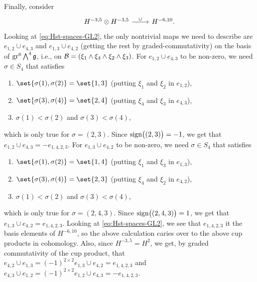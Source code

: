 Finally, consider
\[
  \begin{tikzcd}
    H^{-3,5} \otimes H^{-3,5} \ar[r,"\cup"] & H^{-6,10}.
  \end{tikzcd}
\]
Looking at \eqref{eq:Hst-spaces-GL2}, the only nontrivial maps we need to describe are $e_{1,2} \cup e_{4,3}$ and $e_{1,3} \cup e_{4,2}$ (getting the rest by graded-commutativity) on the basis of $\operatorname{gr}^{6} \bigwedge^{4}\mathfrak{g}$, i.e., on $\mathcal{B} = (\xi_{1} \wedge \xi_{4} \wedge \xi_{2} \wedge \xi_{3})$.  For $e_{1,2} \cup e_{4,3}$ to be non-zero, we need $\sigma \in S_{4}$ that satisfies
\begin{enumerate}[$\bullet$]
  \item $\set{\sigma(1),\sigma(2)} = \set{1,3}$ (putting $\xi_{1}$ and $\xi_{2}$ in $e_{1,2}$),
  \item $\set{\sigma(3),\sigma(4)} = \set{2,4}$ (putting $\xi_{4}$ and $\xi_{3}$ in $e_{4,3}$),
  \item $\sigma(1) < \sigma(2)$ and $\sigma(3) < \sigma(4)$,
\end{enumerate}
which is only true for $\sigma = (2,3)$. Since $\operatorname{sign}\bigl((2,3)\bigr) = -1$, we get that $e_{1,2} \cup e_{4,3} = -e_{1,4,2,3}$. For $e_{1,3} \cup e_{4,2}$ to be non-zero, we need $\sigma \in S_{4}$ that satisfies
\begin{enumerate}[$\bullet$]
  \item $\set{\sigma(1),\sigma(2)} = \set{1,4}$ (putting $\xi_{1}$ and $\xi_{3}$ in $e_{1,3}$),
  \item $\set{\sigma(3),\sigma(4)} = \set{2,3}$ (putting $\xi_{4}$ and $\xi_{2}$ in $e_{4,2}$),
  \item $\sigma(1) < \sigma(2)$ and $\sigma(3) < \sigma(4)$,
\end{enumerate}
which is only true for $\sigma = (2,4,3)$. Since $\operatorname{sign}\bigl( (2,4,3) \bigr) = 1$, we get that $e_{1,3} \cup e_{4,2} = e_{1,4,2,3}$. Looking at \eqref{eq:Hst-spaces-GL2}, we see that $e_{1,4,2,3}$ it the basis elements of $H^{-6,10}$, so the above calculation caries over to the above cup products in cohomology. Also, since $H^{-3,5} = H^{2}$, we get, by graded commutativity of the cup product, that $e_{4,2} \cup e_{1,3} = (-1)^{2\times2} e_{1,3} \cup e_{4,2} = e_{1,4,2,3}$ and $e_{4,3} \cup e_{1,2} = (-1)^{2\times2} e_{1,2} \cup e_{4,3} = -e_{1,4,2,3}$.

